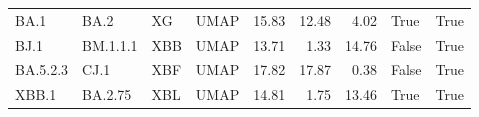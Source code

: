 \begin{tabular}{llllrrrll}
      BA.1 &       BA.2 &            XG &   UMAP &         15.83 &         12.48 &          4.02 &                             True &                           True \\
      BJ.1 &   BM.1.1.1 &           XBB &   UMAP &         13.71 &          1.33 &         14.76 &                            False &                           True \\
  BA.5.2.3 &       CJ.1 &           XBF &   UMAP &         17.82 &         17.87 &          0.38 &                            False &                           True \\
     XBB.1 &    BA.2.75 &           XBL &   UMAP &         14.81 &          1.75 &         13.46 &                             True &                           True \\
\bottomrule
\end{tabular}
